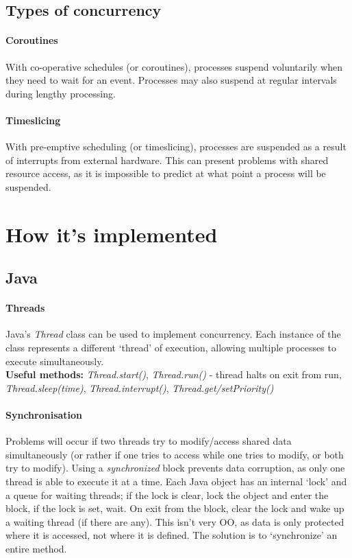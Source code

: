 \documentclass[a4paper,oneside]{report}
\begin{document}
    	\subsection{Types of concurrency}
    	
    	\paragraph{Coroutines} With co-operative schedules (or coroutines), processes suspend voluntarily  when they need to wait for an event. Processes may also suspend at regular intervals during lengthy processing.
    	
    	\paragraph{Timeslicing} With pre-emptive scheduling (or timeslicing), processes are suspended as a result of interrupts from external hardware. This can present problems with shared resource access, as it is impossible to predict at what point a process will be suspended.
    	
  	\section{How it's implemented}
  	
    	\subsection{Java}
      		
      		\paragraph{Threads} Java's \emph{Thread} class can be used to implement concurrency. Each instance of the class represents a different `thread' of execution, allowing multiple processes to execute simultaneously.\\ 
\textbf{Useful methods:} \emph{Thread.start()}, \emph{Thread.run()} - thread halts on exit from run, \emph{Thread.sleep(time)}, \emph{Thread.interrupt()}, \emph{Thread.get/setPriority()}

      		\paragraph{Synchronisation} Problems will occur if two threads try to modify/access shared data simultaneously (or rather if one tries to access while one tries to modify, or both try to modify). Using a \emph{synchronized} block prevents data corruption, as only one thread is able to execute it at a time. Each Java object has an internal ‘lock’ and a queue for waiting threads; if the lock is clear, lock the object and enter the block, if the lock is set, wait. On exit from the block, clear the lock and wake up a waiting thread (if there are any). This isn't very OO, as data is only protected where it is accessed, not where it is defined. The solution is to `synchronize' an entire method.
      		
\end{document}
